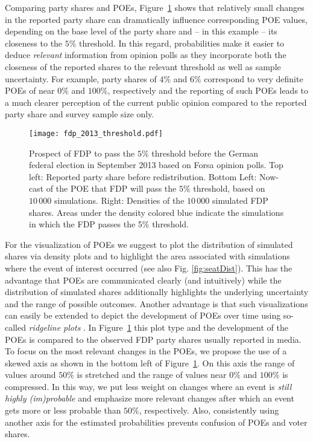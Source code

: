 \documentclass[smallextended]{svjour3}      %
\begin{document}
Comparing party shares and POEs, Figure~\ref{fig:2013_fdp} shows
that relatively small changes in the reported party share can dramatically influence
corresponding POE values, depending on the base level of the party share and
-- in this example -- its closeness to the $5\%$ threshold.
In this regard, probabilities make it easier to deduce {\it relevant} information
from opinion polls as they incorporate both the closeness of the reported shares
to the relevant threshold as well as sample uncertainty.
For example, party shares of $4\%$ and $6\%$
correspond to very definite POEs of near $0\%$ and $100\%$,
respectively and the reporting of such POEs leads to a much clearer perception
of the current public opinion compared to the reported party share and
survey sample size only. \\

\begin{figure}[H]\centering
\texttt{[image: fdp\_2013\_threshold.pdf]}
\caption{Prospect of FDP to pass the $5\%$ threshold before the
German federal election in September 2013 based on Forsa opinion polls.
Top left: Reported party share before redistribution. Bottom Left: Now-cast
of the POE that FDP will pass the $5\%$ threshold, based on $10\,000$ simulations.
Right: Densities of the $10\,000$ simulated FDP shares. Areas under
the density colored blue indicate the simulations in which the FDP passes the
5\% threshold.
\label{fig:2013_fdp}
}
\end{figure}

For the visualization of POEs we suggest to plot the distribution of
simulated shares via density plots and to highlight the area associated
with simulations where the event of interest occurred
(see also Fig. \ref{fig:seatDist}). This has the advantage that POEs are
communicated clearly (and intuitively) while the distribution of simulated
shares additionally highlights the underlying uncertainty and the range
of possible outcomes. Another advantage is that such visualizations can easily
be extended to depict the development of POEs over time using so-called
\emph{ridgeline plots} \citep{wilke_2017}. In Figure~\ref{fig:2013_fdp} this
plot type and the development of the POEs is compared to the observed
FDP party shares usually reported in media. \\

To focus on the most relevant changes in the POEs, we propose
the use of a skewed axis as shown in the bottom left of Figure~\ref{fig:2013_fdp}.
On this axis
the range of values around $50\%$ is stretched and the range of values near
$0\%$ and $100\%$ is compressed. In this way, we put less weight on changes
where an event is {\it still highly (im)probable} and emphasize more relevant
changes after which an event gets more or less probable than $50\%$, respectively. Also,
consistently using another axis for the estimated probabilities prevents
confusion of POEs and voter shares.
\end{document}
